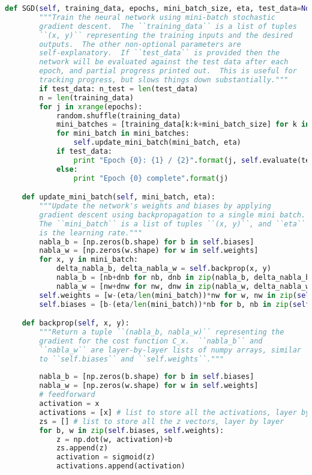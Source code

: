 \begin{lstlisting}[language=Python, caption=Codi original per la xarxa neuronal clàssica]
	def SGD(self, training_data, epochs, mini_batch_size, eta, test_data=None):
		"""Train the neural network using mini-batch stochastic
		gradient descent.  The ``training_data`` is a list of tuples
		``(x, y)`` representing the training inputs and the desired
		outputs.  The other non-optional parameters are
		self-explanatory.  If ``test_data`` is provided then the
		network will be evaluated against the test data after each
		epoch, and partial progress printed out.  This is useful for
		tracking progress, but slows things down substantially."""
		if test_data: n_test = len(test_data)
		n = len(training_data)
		for j in xrange(epochs):
			random.shuffle(training_data)
			mini_batches = [training_data[k:k+mini_batch_size] for k in xrange(0, n, mini_batch_size)]
			for mini_batch in mini_batches:
				self.update_mini_batch(mini_batch, eta)
			if test_data:
				print "Epoch {0}: {1} / {2}".format(j, self.evaluate(test_data), n_test)
			else:
				print "Epoch {0} complete".format(j)

	def update_mini_batch(self, mini_batch, eta):
		"""Update the network's weights and biases by applying
		gradient descent using backpropagation to a single mini batch.
		The ``mini_batch`` is a list of tuples ``(x, y)``, and ``eta``
		is the learning rate."""
		nabla_b = [np.zeros(b.shape) for b in self.biases]
		nabla_w = [np.zeros(w.shape) for w in self.weights]
		for x, y in mini_batch:
			delta_nabla_b, delta_nabla_w = self.backprop(x, y)
			nabla_b = [nb+dnb for nb, dnb in zip(nabla_b, delta_nabla_b)]
			nabla_w = [nw+dnw for nw, dnw in zip(nabla_w, delta_nabla_w)]
		self.weights = [w-(eta/len(mini_batch))*nw for w, nw in zip(self.weights, nabla_w)]
		self.biases = [b-(eta/len(mini_batch))*nb for b, nb in zip(self.biases, nabla_b)]

	def backprop(self, x, y):
		"""Return a tuple ``(nabla_b, nabla_w)`` representing the
		gradient for the cost function C_x.  ``nabla_b`` and
		``nabla_w`` are layer-by-layer lists of numpy arrays, similar
		to ``self.biases`` and ``self.weights``."""
		
		nabla_b = [np.zeros(b.shape) for b in self.biases]
		nabla_w = [np.zeros(w.shape) for w in self.weights]
		# feedforward
		activation = x
		activations = [x] # list to store all the activations, layer by layer
		zs = [] # list to store all the z vectors, layer by layer
		for b, w in zip(self.biases, self.weights):
			z = np.dot(w, activation)+b
			zs.append(z)
			activation = sigmoid(z)
			activations.append(activation)
			

\end{lstlisting}
